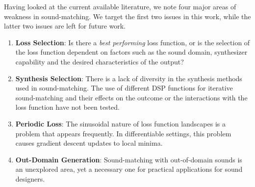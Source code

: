 \documentclass[lettersize,journal]{IEEEtran}
\providecommand{\gls}[1]{#1}
\newcommand{\LossSelect}{\textbf{Loss Selection}}
\newcommand{\SynthSelect}{\textbf{Synthesis Selection}}
\newcommand{\PeriodicLoss}{\textbf{Periodic Loss}}
\newcommand{\OutDomain}{\textbf{Out-Domain Generation}}
\begin{document}


Having looked at the current available literature, we note four major areas of weakness in sound-matching. We target the first two issues in this work, while the latter two issues are left for future work. 
\begin{enumerate}
    \item \LossSelect: Is there a \textit{best performing} loss function, or is the selection of the loss function dependent on factors such as the sound domain, synthesizer capability and the desired characteristics of the output? 
    \item \SynthSelect: There is a lack of diversity in the synthesis methods used in sound-matching. The use of different DSP functions for iterative sound-matching and their effects on the outcome or the interactions with the loss function have not been tested.
    \item \PeriodicLoss: The sinusoidal nature of loss function landscapes is a problem that appears frequently. In differentiable settings, this problem causes gradient descent updates to local minima. 
    \item \OutDomain: Sound-matching with out-of-domain sounds is an unexplored area, yet a necessary one for practical applications for sound designers.
\end{enumerate}
\end{document}
